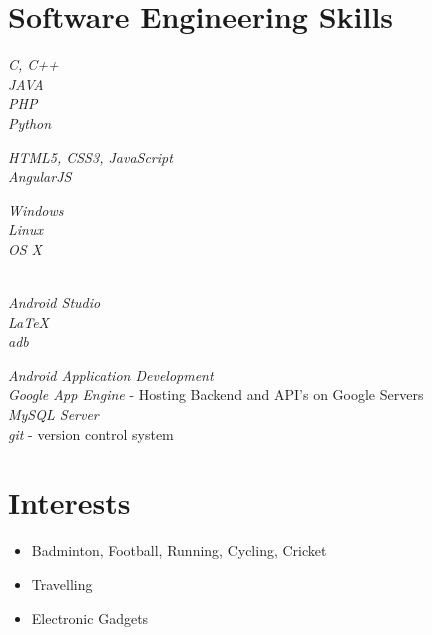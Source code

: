 \documentclass[10pt]{article} %
\begin{document}
\section{Software Engineering Skills}

{
\textit{C, C++}\\
\textit{JAVA}\\
\textit{PHP}\\
\textit{Python}
}


{
\textit{HTML5, CSS3, JavaScript}\\
\textit{AngularJS}\\
}


{
\textit{Windows}\\
\textit{Linux}\\
\textit{OS X \\}\\
}

{
\textit{Android Studio}\\
\textit{\LaTeX}\\
\textit{adb}\\
}



{
\textit{Android Application Development} \\
\textit{Google App Engine} - Hosting Backend and API's on Google Servers\\
\textit{MySQL Server}\\
\textit{git} - version control system
}


\section{Interests}

\begin{itemize}
\item{Badminton, Football, Running, Cycling, Cricket}
\item{Travelling}
\item{Electronic Gadgets}
\end{itemize}
\end{document}
